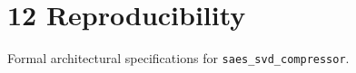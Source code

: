 \section{12 Reproducibility}

Formal architectural specifications for \texttt{saes_svd_compressor}.
